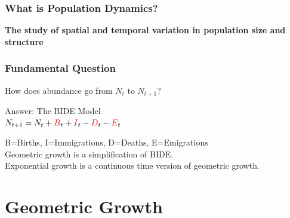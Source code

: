 \documentclass[color=usenames,dvipsnames]{beamer}\usepackage[]{graphicx}\usepackage[]{color}
\begin{document}




\begin{frame}
  \frametitle{What is Population Dynamics?}
  {\centering \Large \bf The study of spatial and temporal variation in
    population size and structure \\ }
\end{frame}






\begin{frame}%
  \frametitle{Fundamental Question}
  \begin{center}
   { \Large How does abundance go from $N_t$ to $N_{t+1}$?} \par
   \vspace{1.5cm}
   \large
   \pause
   Answer: The {\color{red} BIDE} Model  \\
     $N_{t+1} = N_t + {\color{red}B}_t + {\color{red}I}_t - {\color{red}D}_t - {\color{red}E}_t$
  \vspace{2mm}
  \end{center}
  B=Births, I=Immigrations, D=Deaths, E=Emigrations \\
  \pause
  \vfill
  Geometric growth is a simplification of BIDE. \\
  \vspace{2mm}
  Exponential growth is a continuous time version of geometric growth.
\end{frame}



\section{Geometric Growth}



\end{document}
